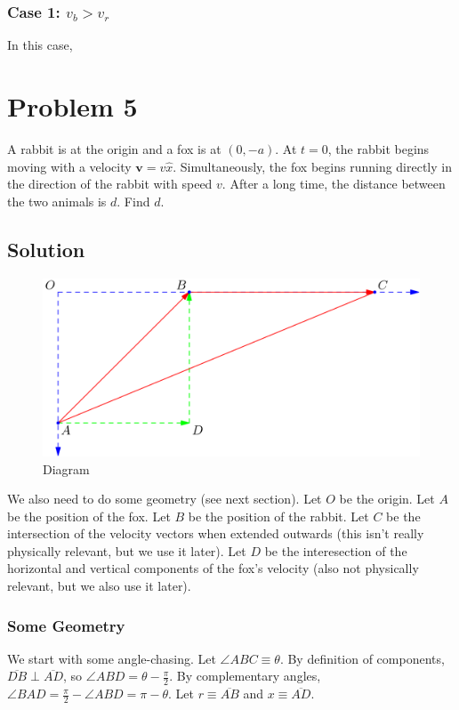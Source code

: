 \documentclass[11pt]{scrartcl}
\begin{document}
\subsubsection{Case 1: $v_b > v_r $}
In this case, 

\newpage

\section{Problem 5}
A rabbit is at the origin and a fox is at $(0, -a)$.
At $t=0$, the rabbit begins moving with a velocity $\bm{v} = v \hat{x}$.
Simultaneously, the fox begins running directly in the direction of the rabbit with speed $v$.
After a long time, the distance between the two animals is $d$.
Find $d$.

\subsection{Solution}
\begin{figure}[h]
\caption{Diagram}
\centering
\includegraphics[scale = 0.5]{diagram5.png}
\end{figure}

We also need to do some geometry (see next section).
Let $O$ be the origin.
Let $A$ be the position of the fox.
Let $B$ be the position of the rabbit.
Let $C$ be the intersection of the velocity vectors when extended outwards (this isn't really physically relevant, but we use it later).
Let $D$ be the interesection of the horizontal and vertical components of the fox's velocity (also not physically relevant, but we also use it later).

\subsubsection{Some Geometry}

We start with some angle-chasing.
Let $\angle ABC \equiv \theta$.
By definition of components, $\overline{DB} \perp \overline{AD}$, so $\angle ABD = \theta - \frac{\pi}{2}$.
By complementary angles, $\angle BAD = \frac{\pi}{2} - \angle ABD = \pi - \theta $.
Let $r \equiv \overline{AB}$ and $x \equiv \overline{AD}$.
\end{document}
